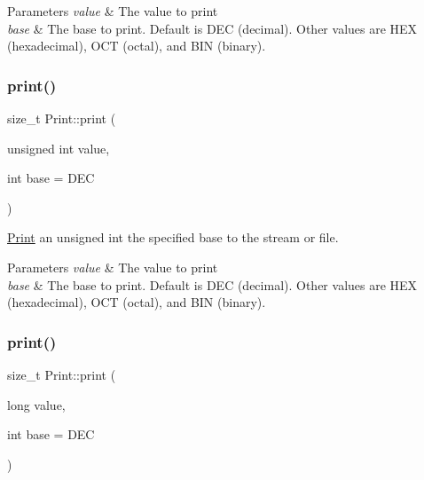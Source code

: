 \begin{DoxyParams}{Parameters}
{\em value} & The value to print \\
\hline
{\em base} & The base to print. Default is D\+EC (decimal). Other values are H\+EX (hexadecimal), O\+CT (octal), and B\+IN (binary). \\
\hline
\end{DoxyParams}
\mbox{\label{class_print_afcd7d3a184df961a502643e4fb638c52}} 
\subsubsection{\texorpdfstring{print()}{print()}\hspace{0.1cm}{\footnotesize\ttfamily [3/6]}}
{\footnotesize\ttfamily size\+\_\+t Print\+::print (\begin{DoxyParamCaption}\item[{unsigned int}]{value,  }\item[{int}]{base = {\ttfamily DEC} }\end{DoxyParamCaption})}



\mbox{\hyperlink{class_print}{Print}} an unsigned int the specified base to the stream or file. 


\begin{DoxyParams}{Parameters}
{\em value} & The value to print \\
\hline
{\em base} & The base to print. Default is D\+EC (decimal). Other values are H\+EX (hexadecimal), O\+CT (octal), and B\+IN (binary). \\
\hline
\end{DoxyParams}
\mbox{\label{class_print_a0c663ac015ebc037ea044ba2e2cf2947}} 
\subsubsection{\texorpdfstring{print()}{print()}\hspace{0.1cm}{\footnotesize\ttfamily [4/6]}}
{\footnotesize\ttfamily size\+\_\+t Print\+::print (\begin{DoxyParamCaption}\item[{long}]{value,  }\item[{int}]{base = {\ttfamily DEC} }\end{DoxyParamCaption})}



